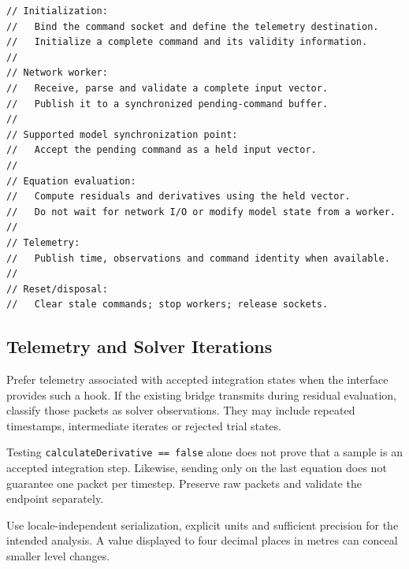 \documentclass[11pt, letterpaper]{article}
\begin{document}
\begin{lstlisting}[style=csharpstyle,caption={Conceptual DLL design; adapt to the installed EETK interface}]
// Initialization:
//   Bind the command socket and define the telemetry destination.
//   Initialize a complete command and its validity information.
//
// Network worker:
//   Receive, parse and validate a complete input vector.
//   Publish it to a synchronized pending-command buffer.
//
// Supported model synchronization point:
//   Accept the pending command as a held input vector.
//
// Equation evaluation:
//   Compute residuals and derivatives using the held vector.
//   Do not wait for network I/O or modify model state from a worker.
//
// Telemetry:
//   Publish time, observations and command identity when available.
//
// Reset/disposal:
//   Clear stale commands; stop workers; release sockets.
\end{lstlisting}

\subsection{Telemetry and Solver Iterations}
Prefer telemetry associated with accepted integration states when the interface provides such a hook. If the existing bridge transmits during residual evaluation, classify those packets as solver observations. They may include repeated timestamps, intermediate iterates or rejected trial states.

Testing \texttt{calculateDerivative == false} alone does not prove that a sample is an accepted integration step. Likewise, sending only on the last equation does not guarantee one packet per timestep. Preserve raw packets and validate the endpoint separately.

Use locale-independent serialization, explicit units and sufficient precision for the intended analysis. A value displayed to four decimal places in metres can conceal smaller level changes.
\end{document}

